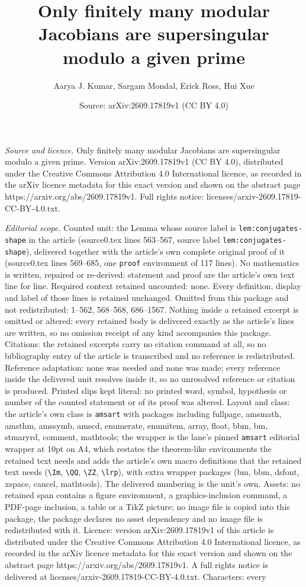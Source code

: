 \documentclass[10pt,a4paper]{amsart}
\title[Only finitely many modular Jacobians are supersingular modul]{Only finitely many modular Jacobians are supersingular modulo a given prime}
\author{Aarya J. Kumar, Sargam Mondal, Erick Ross, Hui Xue}
\date{Source: arXiv:2609.17819v1 (CC BY 4.0)}
\begin{document}
\maketitle

\noindent\emph{Source and licence.} Only finitely many modular Jacobians are supersingular modulo a given prime. Version arXiv:2609.17819v1 (CC BY 4.0), distributed under the Creative Commons Attribution 4.0 International licence, as recorded in the arXiv licence metadata for this exact version and shown on the abstract page https://arxiv.org/abs/2609.17819v1. Full rights notice: licenses/arxiv-2609.17819-CC-BY-4.0.txt.\par\smallskip

\noindent\textit{Editorial scope.} Counted unit: the Lemma whose source label is \texttt{lem:conjugates-shape} in the article (source0.tex lines 563--567, source label \texttt{lem:conjugates-shape}), delivered together with the article's own complete original proof of it (source0.tex lines 569--685, one \texttt{proof} environment of 117 lines). No mathematics is written, repaired or re-derived: statement and proof are the article's own text line for line. Required context retained uncounted: none. Every definition, display and label of those lines is retained unchanged. Omitted from this package and not redistributed: 1--562, 568--568, 686--1567. Nothing inside a retained excerpt is omitted or altered: every retained body is delivered exactly as the article's lines are written, so no omission receipt of any kind accompanies this package. Citations: the retained excerpts carry no citation command at all, so no bibliography entry of the article is transcribed and no reference is redistributed. Reference adaptation: none was needed and none was made; every reference inside the delivered unit resolves inside it, so no unresolved reference or citation is produced. Printed slips kept literal: no printed word, symbol, hypothesis or number of the counted statement or of its proof was altered. Layout and class: the article's own class is \texttt{amsart} with packages including fullpage, amsmath, amsthm, amssymb, amscd, enumerate, enumitem, array, float, bbm, bm, stmaryrd, comment, mathtools; the wrapper is the lane's pinned \texttt{amsart} editorial wrapper at 10pt on A4, which restates the theorem-like environments the retained text needs and adds the article's own macro definitions that the retained text needs (\texttt{\textbackslash Im}, \texttt{\textbackslash QQ}, \texttt{\textbackslash ZZ}, \texttt{\textbackslash lrp}), with extra wrapper packages (bm, bbm, dsfont, xspace, cancel, mathtools). The delivered numbering is the unit's own. Assets: no retained span contains a figure environment, a graphics-inclusion command, a PDF-page inclusion, a table or a TikZ picture; no image file is copied into this package, the package declares no asset dependency and no image file is redistributed with it. Licence: version arXiv:2609.17819v1 of this article is distributed under the Creative Commons Attribution 4.0 International licence, as recorded in the arXiv licence metadata for this exact version and shown on the abstract page https://arxiv.org/abs/2609.17819v1. A full rights notice is delivered at licenses/arxiv-2609.17819-CC-BY-4.0.txt. Characters: every 
\end{document}
